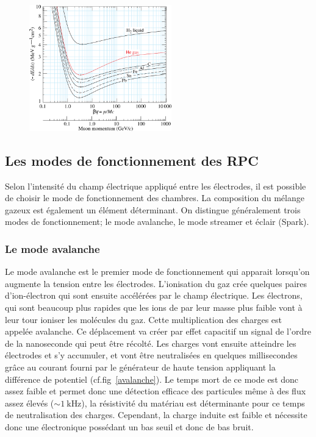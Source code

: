 \begin{figure}[ht!]
	\centering
	\includegraphics[width=0.55\textwidth]{RPC/energylost.png}
	\label{mat}
\end{figure}

\subsection{Les modes de fonctionnement des RPC}

Selon l'intensité du champ électrique appliqué  entre les électrodes, il est possible de choisir le mode de fonctionnement des chambres. La composition du mélange gazeux est également un élément déterminant. On distingue généralement trois modes de fonctionnement; le mode avalanche, le mode streamer et éclair (Spark).

\subsubsection{Le mode avalanche}

Le mode avalanche est le premier mode de fonctionnement qui apparait lorsqu'on augmente la tension entre les électrodes. L'ionisation du gaz crée quelques paires d'ion-électron qui sont ensuite accélérées par le champ électrique. Les électrons, qui sont beaucoup plus rapides que les ions de par leur masse plus faible vont à leur tour ioniser les molécules du gaz. Cette multiplication des charges est appelée avalanche. Ce déplacement va créer par effet capacitif un signal de l'ordre de la nanoseconde qui peut être récolté. Les charges vont ensuite atteindre les électrodes et s'y accumuler, et vont être neutralisées en quelques millisecondes grâce au courant fourni par le générateur de haute tension appliquant la différence de potentiel (cf.fig~\ref{avalanche}). Le temps mort de ce mode est donc assez faible et permet donc une détection efficace des particules même à des flux assez élevés ($\sim\SI{1}{\kilo\hertz}$), la résistivité du matériau est déterminante pour ce temps de neutralisation des charges. Cependant, la charge induite est faible et nécessite donc une électronique possédant un bas seuil et donc de bas bruit.


